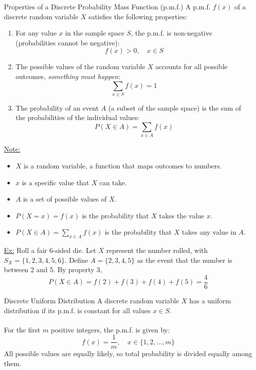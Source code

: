 ﻿\documentclass[12pt]{article}
\begin{document}
\begin{theorem}{Properties of a Discrete Probability Mass Function (p.m.f.)}
A p.m.f. $f(x)$ of a discrete random variable $X$ satisfies the following properties:
\begin{enumerate}
    \item For any value $x$ in the sample space $S$, the p.m.f. is non-negative (probabilities cannot be negative):
    \[f(x) > 0,\quad x \in S\]
    \item The possible values of the random variable $X$ accounts for all possible outcomes, \textit{something must happen}: 
    \[\sum_{x \in S} f(x) = 1\]
    \item The probability of an event $A$ (a subset of the sample space) is the sum of the probabilities of the individual values:
    \[P(X \in A) = \sum_{x \in A} f(x)\]
\end{enumerate}
\underline{Note:}
\begin{itemize}
    \item $X$ is a random variable, a function that maps outcomes to numbers.
    \item $x$ is a specific value that $X$ can take.
    \item $A$ is a set of possible values of $X$.
    \item $P(X=x)=f(x)$ is the probability that $X$ takes the value $x$.
    \item $P(X\in A)=\sum_{x\in A}f(x)$ is the probability that $X$ takes any value in $A$.
\end{itemize}

\underline{Ex:} Roll a fair 6-sided die. Let $X$ represent the number rolled, with $S_X=\{1,2,3,4,5,6\}$. Define $A=\{2,3,4,5\}$ as the event that the number is between 2 and 5. By property 3,
\[P(X\in A)=f(2)+f(3)+f(4)+f(5)=\frac{4}{6}\]
\end{theorem}

\begin{definition}{Discrete Uniform Distribution}
    A discrete random variable $X$ has a uniform distribution if its p.m.f. is constant for all values $x\in S$.\\\\
    For the first $m$ positive integers, the p.m.f. is given by:
    \[f(x) = \frac{1}{m}, \quad x \in \{1,2,\dots,m\}\]
    All possible values are equally likely, so total probability is divided equally among them.
\end{definition}
\end{document}
